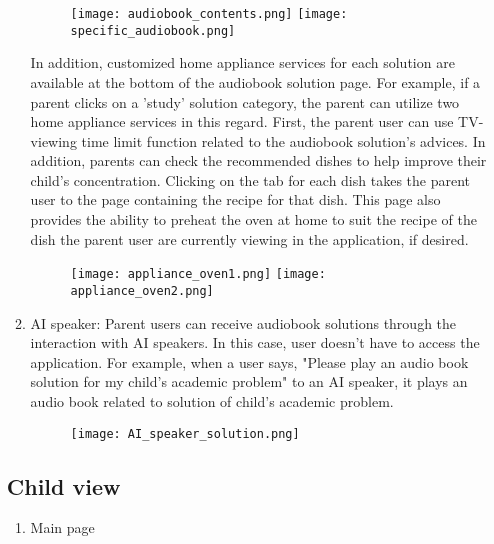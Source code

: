 \documentclass[conference]{IEEEtran}
\begin{document}
\begin{enumerate}
\begin{enumerate}
                 \begin{figure}[H]
                 \centering
                 \texttt{[image: audiobook\_contents.png]}
                 \texttt{[image: specific\_audiobook.png]}
                 \end{figure}
                 In addition, customized home appliance services for each solution are available at the bottom of the audiobook solution page. For example, if a parent clicks on a 'study' solution category, the parent can utilize two home appliance services in this regard. First, the parent user can use TV-viewing time limit function related to the audiobook solution's advices. In addition, parents can check the recommended dishes to help improve their child's concentration. Clicking on the tab for each dish takes the parent user to the page containing the recipe for that dish. This page also provides the ability to preheat the oven at home to suit the recipe of the dish the parent user are currently viewing in the application, if desired.
                  \begin{figure}[H]
                 \centering
                 \texttt{[image: appliance\_oven1.png]}
                 \texttt{[image: appliance\_oven2.png]}
                 \end{figure}
                \item AI speaker: Parent users can receive audiobook solutions through the interaction with AI speakers. In this case, user doesn't have to access the application. For example, when a user says, "Please play an audio book solution for my child's academic problem" to an AI speaker, it plays an audio book related to solution of child's academic problem.
                 \begin{figure}[H]
                 \centering
                 \texttt{[image: AI\_speaker\_solution.png]}
                 \end{figure}
            \end{enumerate}

        \subsection{Child view}
        \begin{enumerate}
            \item Main page
            

\end{enumerate}
\end{enumerate}
\end{document}
